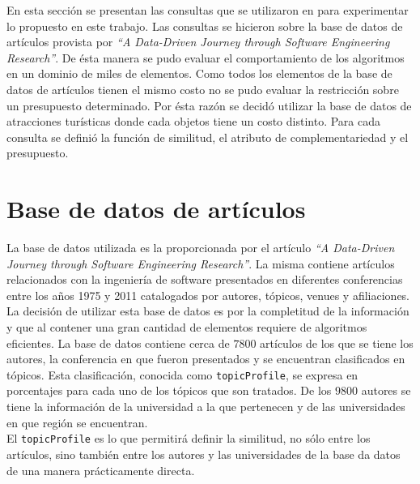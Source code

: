 En esta sección se presentan las consultas que se utilizaron en para experimentar lo propuesto en este trabajo. Las consultas se hicieron sobre la base de datos de artículos provista por \textit{\textquotedblleft A Data-Driven Journey through Software Engineering Research\textquotedblright}\cite{dataDrive}. De ésta manera se pudo evaluar el comportamiento de los algoritmos en un dominio de miles de elementos. Como todos los elementos de la base de datos de artículos tienen el mismo costo no se pudo evaluar la restricción sobre un presupuesto determinado. Por ésta razón se decidó utilizar la base de datos de atracciones turísticas donde cada objetos tiene un costo distinto. Para cada consulta se definió la función de similitud, el atributo de complementariedad y el presupuesto. 
\section{Base de datos de artículos}
La base de datos utilizada es la proporcionada por el artículo \textit{\textquotedblleft A Data-Driven Journey through Software Engineering Research\textquotedblright}\cite{dataDrive}. La misma contiene artículos relacionados con la ingeniería de software presentados en diferentes conferencias entre los años 1975 y 2011 catalogados por autores, tópicos, venues y afiliaciones. La decisión de utilizar esta base de datos es por la completitud de la información y que al contener una gran cantidad de elementos requiere de algoritmos eficientes. La base de datos contiene cerca de $7800$ artículos de los que se tiene los autores, la conferencia en que fueron presentados y se encuentran clasificados en tópicos. Esta clasificación, conocida como \texttt{topicProfile}, se expresa en porcentajes para cada uno de los tópicos que son tratados. De los $9800$ autores se tiene la información de la universidad a la que pertenecen y de las universidades en que región se encuentran.\\
El \texttt{topicProfile} es lo que permitirá definir la similitud, no sólo entre los artículos, sino también entre los autores y las universidades de la base da datos de una manera prácticamente directa.\\

